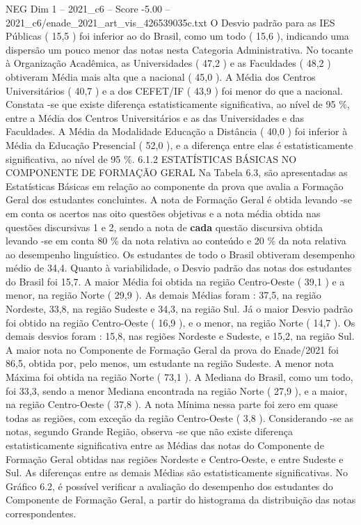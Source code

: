 \begin{textsample}{NEG Dim 1 – 2021\_c6 – Score -5.00 – 2021\_c6/enade\_2021\_art\_vis\_426539035c.txt}
O Desvio padrão para as IES Públicas ( 15,5 ) foi inferior ao do Brasil, como um todo ( 15,6 ), indicando uma dispersão um pouco menor das notas nesta Categoria Administrativa.
No tocante à Organização Acadêmica, as Universidades ( 47,2 ) e as Faculdades ( 48,2 ) obtiveram Média mais alta que a nacional ( 45,0 ).
A Média dos Centros Universitários ( 40,7 ) e a dos CEFET/IF ( 43,9 ) foi menor do que a nacional.
Constata -se que existe diferença estatisticamente significativa, ao nível de 95 \%, entre a Média dos Centros Universitários e as das Universidades e das Faculdades.
A Média da Modalidade Educação a Distância ( 40,0 ) foi inferior à Média da Educação Presencial ( 52,0 ), e a diferença entre elas é estatisticamente significativa, ao nível de 95 \%. 6.1.2 ESTATÍSTICAS BÁSICAS NO COMPONENTE DE FORMAÇÃO GERAL Na Tabela 6.3, são apresentadas as Estatísticas Básicas em relação ao componente da prova que avalia a Formação Geral dos estudantes concluintes.
A nota de Formação Geral é obtida levando -se em conta os acertos nas oito questões objetivas e a nota média obtida nas questões discursivas 1 e 2, sendo a nota de \textbf{cada} questão discursiva obtida levando -se em conta 80 \% da nota relativa ao conteúdo e 20 \% da nota relativa ao desempenho linguístico.
Os estudantes de todo o Brasil obtiveram desempenho médio de 34,4.
Quanto à variabilidade, o Desvio padrão das notas dos estudantes do Brasil foi 15,7.
A maior Média foi obtida na região Centro-Oeste ( 39,1 ) e a menor, na região Norte ( 29,9 ).
As demais Médias foram : 37,5, na região Nordeste, 33,8, na região Sudeste e 34,3, na região Sul.
Já o maior Desvio padrão foi obtido na região Centro-Oeste ( 16,9 ), e o menor, na região Norte ( 14,7 ).
Os demais desvios foram : 15,8, nas regiões Nordeste e Sudeste, e 15,2, na região Sul.
A maior nota no Componente de Formação Geral da prova do Enade/2021 foi 86,5, obtida por, pelo menos, um estudante na região Sudeste.
A menor nota Máxima foi obtida na região Norte ( 73,1 ).
A Mediana do Brasil, como um todo, foi 33,3, sendo a menor Mediana encontrada na região Norte ( 27,9 ), e a maior, na região Centro-Oeste ( 37,8 ).
A nota Mínima nessa parte foi zero em quase todas as regiões, com exceção da região Centro-Oeste ( 3,8 ).
Considerando -se as notas, segundo Grande Região, observa -se que não existe diferença estatisticamente significativa entre as Médias das notas do Componente de Formação Geral obtidas nas regiões Nordeste e Centro-Oeste, e entre Sudeste e Sul.
As diferenças entre as demais Médias são estatisticamente significativas.
No Gráfico 6.2, é possível verificar a avaliação do desempenho dos estudantes do Componente de Formação Geral, a partir do histograma da distribuição das notas correspondentes.

\end{textsample}
